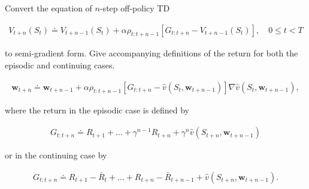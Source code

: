 
\begin{exercise}[Exercise 11.1]

Convert the equation of $n$-step off-policy TD 

\begin{align}
    V_{t+n}(S_t) \doteq V_{t+n-1}(S_t) + \alpha \rho_{t:t+n-1}[G_{t:t+n} - V_{t+n-1}(S_t)], \quad 0 \leq t < T \tag{7.9}
\end{align}

to semi-gradient form.
Give accompanying definitions of the return for both the episodic and
continuing cases.

\end{exercise}


\begin{solution}

\phantom{}

\begin{align*}
    \textbf{w}_{t+n} \doteq \textbf{w}_{t+n-1} + \alpha \rho_{t:t+n-1}[G_{t:t+n} - \hat{v}(S_t, \textbf{w}_{t+n-1})]\nabla \hat{v}(S_t, \textbf{w}_{t+n-1}),
\end{align*}

where the return in the episodic case is defined by

\begin{align*}
    G_{t:t+n} \doteq R_{t+1} + \dots + \gamma^{n-1}R_{t+n} + \gamma^n \hat{v}(S_{t+n}, \textbf{w}_{t+n-1})
\end{align*}

or in the continuing case by

\begin{align*}
G_{t:t+n} \doteq R_{t+1} - \bar{R}_t + \dots + R_{t+n} - \bar{R}_{t+n-1} + \hat{v}(S_{t+n},\textbf{w}_{t+n-1}).
\end{align*}

\end{solution}


